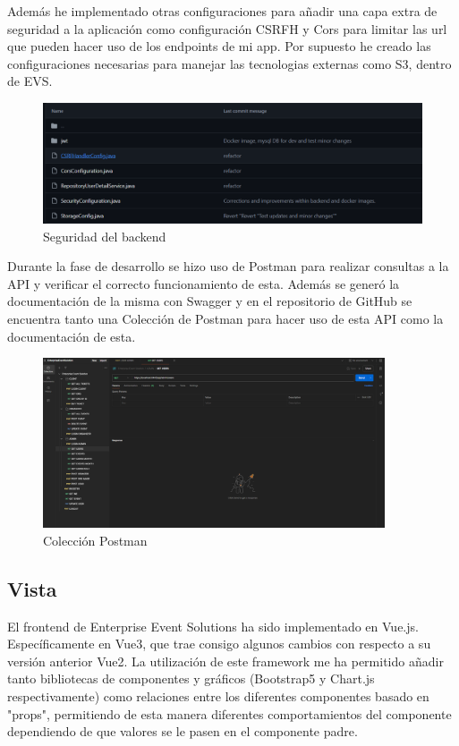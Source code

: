 Además he implementado otras configuraciones para añadir una capa extra de seguridad a la aplicación como configuración CSRFH y Cors para limitar las url 
que pueden hacer uso de los endpoints de mi app. Por supuesto he creado las configuraciones necesarias para manejar las tecnologias externas como S3, dentro de 
EVS.
\newpage
\begin{figure}[h]
    \centering
    \includegraphics[width=1\textwidth]{security.png} 
    \caption{Seguridad del backend}
    \label{fig:securityClasses}
\end{figure}

Durante la fase de desarrollo se hizo uso de Postman para realizar consultas a la API y verificar el correcto funcionamiento de esta. Además se generó la documentación de la
misma con Swagger y en el repositorio de GitHub se encuentra tanto una Colección de Postman para hacer uso de esta API como la documentación de esta.
\newpage
\begin{figure}[h]
    \centering
    \includegraphics[width=0.9\textwidth]{postman.png} 
    \caption{Colección Postman}
    \label{fig:postman}
\end{figure}

\subsection{Vista}
El frontend de Enterprise Event Solutions ha sido implementado en Vue.js. Específicamente en Vue3, que trae consigo algunos cambios con respecto a su versión
anterior Vue2. La utilización de este framework me ha permitido añadir tanto bibliotecas de componentes y gráficos (Bootstrap5 y Chart.js respectivamente)
como relaciones entre los diferentes componentes basado en "props", permitiendo de esta manera diferentes comportamientos del componente dependiendo de
que valores se le pasen en el componente padre.

